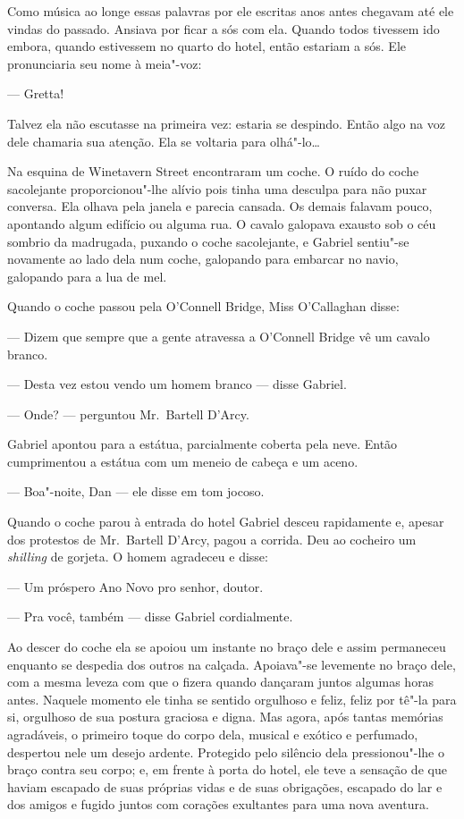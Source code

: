Como música ao longe essas palavras por ele escritas anos antes chegavam até
ele vindas do passado.  Ansiava por ficar a sós com ela.  Quando todos tivessem
ido embora, quando estivessem no quarto do hotel, então estariam a sós.  Ele
pronunciaria seu nome à meia"-voz:

--- Gretta!

Talvez ela não escutasse na primeira vez: estaria se despindo.  Então algo na
voz dele chamaria sua atenção.  Ela se voltaria para olhá"-lo\ldots{}

Na esquina de Winetavern Street encontraram um coche.  O ruído do coche
sacolejante proporcionou"-lhe alívio pois tinha uma desculpa para não puxar
conversa.  Ela olhava pela janela e parecia cansada.  Os demais falavam pouco,
apontando algum edifício ou alguma rua.  O cavalo galopava exausto sob o céu
sombrio da madrugada, puxando o coche sacolejante, e Gabriel sentiu"-se
novamente ao lado dela num coche, galopando para embarcar no navio, galopando
para a lua de mel.

Quando o coche passou pela O’Connell Bridge, Miss O’Callaghan disse:

--- Dizem que sempre que a gente atravessa a O’Connell Bridge vê um cavalo
branco.

--- Desta vez estou vendo um homem branco --- disse Gabriel.

--- Onde? --- perguntou Mr.~Bartell D’Arcy.

Gabriel apontou para a estátua, parcialmente coberta pela neve.  Então
cumprimentou a estátua com um meneio de cabeça e um aceno.

--- Boa"-noite, Dan --- ele disse em tom jocoso.

Quando o coche parou à entrada do hotel Gabriel desceu rapidamente e, apesar
dos protestos de Mr.~Bartell D’Arcy, pagou a corrida.  Deu ao cocheiro um
\textit{shilling} de gorjeta.  O homem agradeceu e disse:

--- Um próspero Ano Novo pro senhor, doutor.

--- Pra você, também --- disse Gabriel cordialmente.

Ao descer do coche ela se apoiou um instante no braço dele e assim permaneceu
enquanto se despedia dos outros na calçada.  Apoiava"-se levemente no braço
dele, com a mesma leveza com que o fizera quando dançaram juntos algumas horas
antes.  Naquele momento ele tinha se sentido orgulhoso e feliz, feliz por tê"-la
para si, orgulhoso de sua postura graciosa e digna.  Mas agora, após tantas
memórias agradáveis, o primeiro toque do corpo dela, musical e exótico e
perfumado, despertou nele um desejo ardente.  Protegido pelo silêncio dela
pressionou"-lhe o braço contra seu corpo; e, em frente à porta do hotel, ele
teve a sensação de que haviam escapado de suas próprias vidas e de suas
obrigações, escapado do lar e dos amigos e fugido juntos com corações
exultantes para uma nova aventura.

